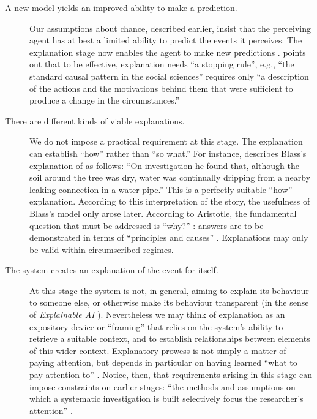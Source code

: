 \begin{description}
\item[A new model yields an improved ability to make a prediction.]
  Our assumptions about chance, described earlier, insist that the
  perceiving agent has at best a limited ability to predict the events
  it perceives.  The explanation stage now enables the agent to make
  new predictions \cite[p.~389]{sowa2000knowledge}.
  \citet[p.~101]{swirski2000between} points out that to be effective,
  explanation needs ``a stopping rule'', e.g., ``the standard causal
  pattern in the social sciences'' requires only ``a description of
  the actions and the motivations behind them that were sufficient to
  produce a change in the circumstances.''
\item[There are different kinds of viable explanations.] We do not
  impose a practical requirement at this stage.  The explanation can
  establish ``how'' rather than ``so what.''  For instance,
  \citet{van1994anatomy} describes Blass's explanation of as follows:
  ``On investigation he found that, although the soil around the tree
  was dry, water was continually dripping from a nearby leaking
  connection in a water pipe.''  This is a perfectly suitable ``how''
  explanation.  According to this interpretation of the story, the
  usefulness of Blass's model only arose later.  According to
  Aristotle, the fundamental question that must be addressed is
  ``why?''  \cite{sep-aristotle-causality}: answers are to be
  demonstrated in terms of ``principles and causes'' \cite[Book Gamma,
    p.~81]{lawson1998metaphysics}.  Explanations may only be valid
  within circumscribed regimes.
\item[The system creates an explanation of the event for itself.]  At
  this stage the system is not, in general, aiming to explain its
  behaviour to someone else, or otherwise make its behaviour transparent
  (in the sense of \emph{Explainable AI}
  \cite{lane2005explainable}).  Nevertheless we may think of
  explanation as an expository device or ``framing''
  \cite{pease2011computational} that relies on the system's ability to
  retrieve a suitable context, and to establish relationships between
  elements of this wider context.  Explanatory prowess is not simply a
  matter of paying attention, but depends in particular on having
  learned ``what to pay attention to'' \cite[p.~4]{levin1975bateson}.
  Notice, then, that requirements arising in this stage can impose
  constraints on earlier stages: ``the methods and assumptions
  on which a systematic investigation is built selectively focus the
  researcher's attention''
  \cite[p.~131]{floppyearedrabbits1958barber}.
\end{description}
                                         
